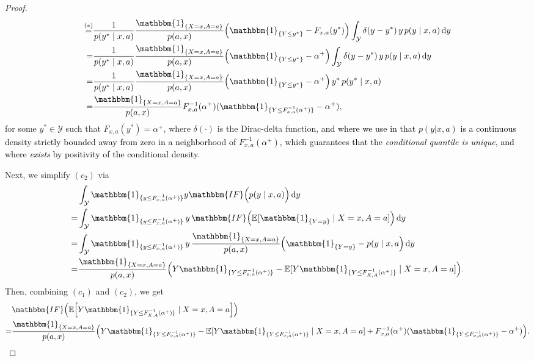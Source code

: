 \documentclass{article} %
\theoremstyle{plain}
\theoremstyle{definition}
\theoremstyle{remark}
\newcommand*\diff{\mathop{}\!\mathrm{d}}
\newcommand{\q}{F_{x,a}^{-1}}
\newcommand{\Q}{F_{X,A}^{-1}}
\newcommand{\Indl}{\mathbbm{1}_{\{Y\leq \q({\alpha^+})\}}}
\newcommand{\indl}{\mathbbm{1}_{\{y\leq \q({\alpha^+})\}}}
\newcommand{\IndL}{\mathbbm{1}_{\{Y\leq \Q({\alpha^+})\}}}
\newcommand{\f}{\mathbbm{IF}}
\newcommand{\stareq}{\mathrel{\stackrel{(*)}{=}}}
\newcommand{\rebuttal}[1]{\textcolor{black}{#1}}
\begin{document}
\begin{proof}
\begin{align}
    \stareq & \frac{1}{p(y^*\mid x,a)}   \frac{\mathbbm{1}_{\{X=x,A=a\}}}{p(a,x)}\Big(\mathbbm{1}_{\{Y\leq y^*\}} - F_{x,a}(y^*)\Big)   \int_\mathcal{Y} \delta(y-y^*)\, y \, p(y\mid x,a)\diff y\\
    =&\frac{1}{p(y^*\mid x,a)}   \frac{\mathbbm{1}_{\{X=x,A=a\}}}{p(a,x)}\Big(\mathbbm{1}_{\{Y\leq y^*\}} - {\alpha^+}\Big)   \int_\mathcal{Y} \delta(y-y^*) \, y \, p(y\mid x,a)\diff y \\
    =&\frac{1}{p(y^*\mid x,a)}   \frac{\mathbbm{1}_{\{X=x,A=a\}}}{p(a,x)}\Big(\mathbbm{1}_{\{Y\leq y^*\}} - {\alpha^+}\Big)  \,  y^* \, p(y^*\mid x,a)\\
    =& \frac{\mathbbm{1}_{\{X=x,A=a\}}}{p(a,x)}\q({\alpha^+}) (\mathbbm{1}_{\{Y\leq \q({\alpha^+})\}} - {\alpha^+}),\label{eq:if_ci}
\end{align}
for some $y^*\in\mathcal{Y}$ such that $F_{x,a}(y^*)={\alpha^+}$, where $\delta(\cdot)$ is the Dirac-delta function, \rebuttal{and where we use in  that $p(y|x,a)$ is a continuous density strictly bounded away from zero in a neighborhood of $F_{x,a}^{-1}(\alpha^+)$, which guarantees that the \emph{conditional quantile is unique}, and where \Eqref{eq:positive_density} \emph{exists} by positivity of the conditional density}.

Next, we simplify $(c_2)$ via
\begin{align}
    &\int_\mathcal{Y} \indl y \f \Big(  p(y\mid x,a)\Big) \diff y\\
    =& \int_\mathcal{Y} \indl \, y \, \f  \Big( \mathbb{E}[\mathbbm{1}_{\{Y= y\}} \mid X=x,A=a]\Big) \diff y\\
    =&  \int_\mathcal{Y} \indl \, y \, \frac{\mathbbm{1}_{\{X=x,A=a\}}}{p(a,x)} \Big(\mathbbm{1}_{\{Y= y\}}-p(y\mid x,a \Big) \diff y\\
    =& \frac{\mathbbm{1}_{\{X=x,A=a\}}}{p(a,x)} \Big( Y\Indl - \mathbb{E}[Y\IndL \mid X=x,A=a]\Big).\label{eq:if_cii}
\end{align}
Then, combining $(c_1)$ and $(c_2)$, we get
\begin{align}
     &\f \Big( \mathbb{E}\Big[Y \IndL \mid X=x,A=a\Big] \Big)\\
     =& \frac{\mathbbm{1}_{\{X=x,A=a\}}}{p(a,x)} \Big(  Y\Indl - \mathbb{E}[Y\Indl \mid X=x,A=a]+\q({\alpha^+})(\mathbbm{1}_{\{Y\leq \q({\alpha^+})\}} - {\alpha^+})\Big).\label{eq:if_c}
\end{align}


\end{proof}
\end{document}
